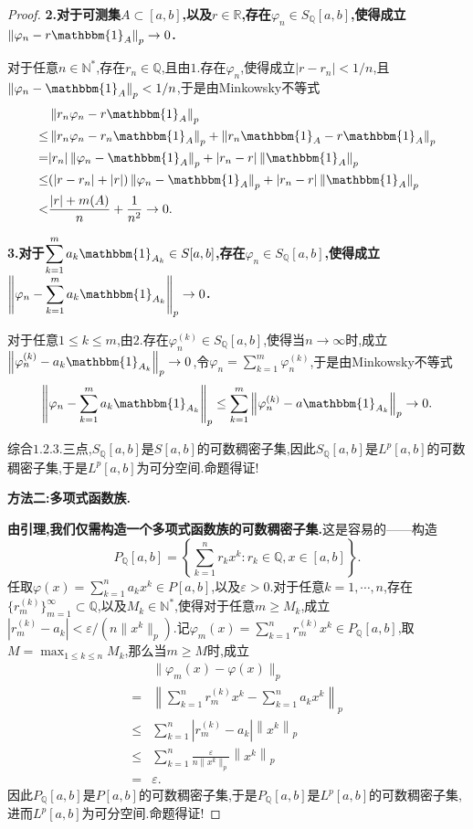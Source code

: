 \documentclass[lang = cn, scheme = chinese]{elegantbook}
\newcommand{\R}{\mathbb{R}}            %
\begin{document}
\begin{proof}
		{\bf 2.对于可测集$A\subset [a,b]$,以及$r\in\R$,存在$\varphi_n\in S_\mathbb{Q}[a,b]$,使得成立$\left\| \varphi_n-r\mathbbm{1}_{A} \right\|_p\to0$.}
		
		对于任意$n\in\mathbb{N}^*$,存在$r_n\in\mathbb{Q}$,且由$1.$存在$\varphi_n$,使得成立$|r-r_n|<1/n$,且$\left\| \varphi_n-\mathbbm{1}_A \right\|_p<1/n$,于是由Minkowsky不等式
		\begin{align*}
			& \left\| r_n\varphi_n-r\mathbbm{1}_A \right\|_p\\
			\le & \left\| r_n\varphi_n-r_n\mathbbm{1}_A \right\|_p+\left\| r_n\mathbbm{1}_A-r\mathbbm{1}_A \right\|_p\\
			= & |r_n|\left\| \varphi_n-\mathbbm{1}_A \right\|_p+|r_n-r|\left\|\mathbbm{1}_A\right\|_p\\
			\le&(|r-r_n|+|r|)\left\| \varphi_n-\mathbbm{1}_A \right\|_p+|r_n-r|\left\|\mathbbm{1}_A\right\|_p\\
			<&\frac{|r|+m(A)}{n}+\frac{1}{n^2}\to0.
		\end{align*}
		
		{\bf 3.对于$\displaystyle\sum_{k=1}^{m}a_k\mathbbm{1}_{A_k}\in S[a,b]$,存在$\varphi_n\in S_\mathbb{Q}[a,b]$,使得成立$\displaystyle \left\| \varphi_n-\sum_{k=1}^{m}a_k\mathbbm{1}_{A_k} \right\|_p\to 0$.}
		
		对于任意$1\le k \le m$,由$2.$存在$\varphi_n^{(k)}\in S_\mathbb{Q}[a,b]$,使得当$n\to\infty$时,成立$\left\| \varphi_n^{(k)}-a_k\mathbbm{1}_{A_k} \right\|_p\to 0$,令$\displaystyle\varphi_n=\sum_{k=1}^{m}\varphi_n^{(k)}$,于是由Minkowsky不等式
		$$
		\left\| \varphi_n-\sum_{k=1}^{m}a_k\mathbbm{1}_{A_k} \right\|_p
		\le \sum_{k=1}^{m}\left\| \varphi_n^{(k)}-a\mathbbm{1}_{A_k} \right\|_p \to0.
		$$
		
		综合$1.2.3.$三点,$S_\mathbb{Q}[a,b]$是$S[a,b]$的可数稠密子集,因此$S_\mathbb{Q}[a,b]$是$L^p[a,b]$的可数稠密子集,于是$L^p[a,b]$为可分空间.命题得证!
		
		{\bf 方法二:多项式函数族.}
		
		{\bf 由引理,我们仅需构造一个多项式函数族的可数稠密子集.}这是容易的——构造
		$$
		P_{\mathbb{Q}}[a,b]=\left\{ \sum_{k=1}^{n}r_k x^k:r_k\in\mathbb{Q},x\in[a,b] \right\}.
		$$
		任取$\displaystyle \varphi(x)=\sum_{k=1}^{n}a_k x^k \in P[a,b]$,以及$\varepsilon>0$.对于任意$k=1,\cdots,n$,存在$\{ r_m^{(k)} \}_{m=1}^{\infty}\subset\mathbb{Q}$,以及$M_k\in\mathbb{N}^*$,使得对于任意$m\ge M_k$,成立$|r_m^{(k)}-a_k|<\varepsilon/(n\|x^k\|_p)$.记$\displaystyle \varphi_m(x)=\sum_{k=1}^{n}r_m^{(k)} x^k \in P_{\mathbb{Q}}[a,b]$,取$\displaystyle M=\max_{1\le k \le n}M_k$,那么当$m\ge M$时,成立
		\begin{align*}
			&\| \varphi_m(x)-\varphi(x) \|_p\\
			=&\left\|  \sum_{k=1}^{n}r_m^{(k)} x^k-\sum_{k=1}^{n}a_k x^k \right\|_p\\
			\le&\sum_{k=1}^{n} |r_m^{(k)}-a_k|\left\|  x^k \right\|_p\\
			\le& \sum_{k=1}^{n}\frac{\varepsilon}{n\|x^k\|_p}\left\|  x^k \right\|_p\\
			=&\varepsilon.
		\end{align*}
		因此$P_\mathbb{Q}[a,b]$是$P[a,b]$的可数稠密子集,于是$P_\mathbb{Q}[a,b]$是$L^p[a,b]$的可数稠密子集,进而$L^p[a,b]$为可分空间.命题得证!
		

\end{proof}
\end{document}
